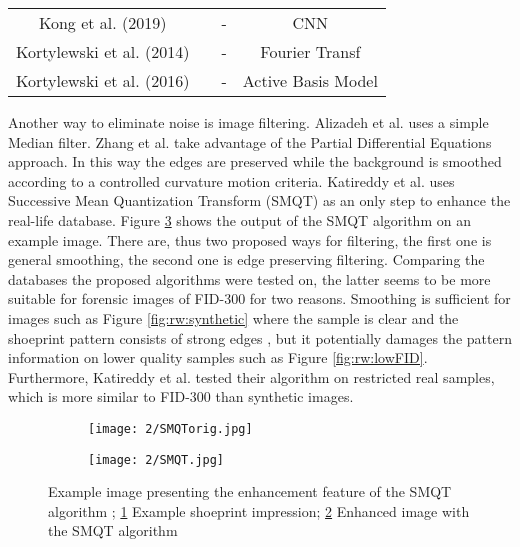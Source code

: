 \documentclass[draft,final]{vutinfth} %
\begin{document}
\begin{sidewaystable}
\begin{minipage}{\linewidth}
\begin{tabular}{c|c|c|c}
Kong et al. (2019) \cite{kong2019cross} & & - & CNN \\
Kortylewski et al. (2014) \cite{kortylewski2014unsupervised} & & - & Fourier Transf \\
Kortylewski et al. (2016) \cite{kortylewski2016probabilistic} & & - & Active Basis Model \\
\end{tabular}
\label{tab:ref:alg} 
\end{minipage}
\end{sidewaystable}

\par
Another way to eliminate noise is image filtering.
Alizadeh et al. \cite{alizadeh2017automatic} uses a simple Median filter.
Zhang et al. \cite{zhang2005automatic} take advantage of the Partial Differential Equations approach.
In this way the edges are preserved while the background is smoothed according to a controlled curvature motion criteria. 
Katireddy et al. \cite{katireddy2017novel} uses Successive Mean Quantization Transform (SMQT) \cite{nilsson2013smqt} as an only step to enhance the real-life database.
Figure \ref{fig:rw:SMQT} shows the output of the SMQT algorithm on an example image.
There are, thus two proposed ways for filtering, the first one is general smoothing, the second one is edge preserving filtering.
Comparing the databases the proposed algorithms were tested on, the latter seems to be more suitable for forensic images of FID-300 for two reasons.
Smoothing is sufficient for images such as Figure \ref{fig:rw:synthetic} where the sample is clear and the shoeprint pattern consists of strong edges \cite{alizadeh2017automatic}, but it potentially damages the pattern information on lower quality samples such as Figure \ref{fig:rw:lowFID}.
Furthermore, Katireddy et al. \cite{katireddy2017novel} tested their algorithm on restricted real samples, which is more similar to FID-300 than synthetic images. 

\begin{figure}[h]
  \centering
  \begin{subfigure}[t]{0.4\columnwidth}
    \centering
    \texttt{[image: 2/SMQTorig.jpg]}
    \subcaption{}
    \label{fig:rw:SMQTin}
  \end{subfigure}
  \begin{subfigure}[t]{0.4\columnwidth}
    \centering
    \texttt{[image: 2/SMQT.jpg]}
    \subcaption{}
    \label{fig:rw:SMQTout}
  \end{subfigure}
  \caption{Example image presenting the enhancement feature of the SMQT algorithm \cite{katireddy2017novel};
		\ref{fig:rw:SMQTin} Example shoeprint impression; \ref{fig:rw:SMQTout} Enhanced image with the SMQT algorithm}
  \label{fig:rw:SMQT} %
\end{figure}
\end{document}
